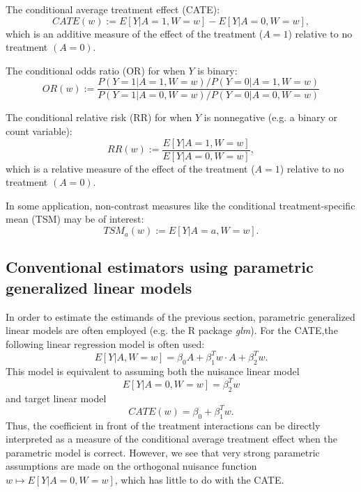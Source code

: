 \documentclass{article}
\begin{document}
\noindent The conditional average treatment effect (CATE):
\begin{equation}
CATE(w) := E[Y|A=1,W=w] - E[Y|A=0, W=w],
\end{equation}
which is an additive measure of the effect of the treatment ($A=1$) relative to no treatment $(A=0)$.

\vspace{0.5cm}


\noindent The conditional odds ratio (OR) for when $Y$ is binary:
\begin{equation}
OR(w) := \frac{P(Y=1|A=1,W=w)/P(Y=0|A=1,W=w)}{P(Y=1|A=0,W=w)/P(Y=0|A=0,W=w)}
\end{equation}

\vspace{0.5cm}

\noindent The conditional relative risk (RR) for when $Y$ is nonnegative (e.g. a binary or count variable):
\begin{equation}
RR(w) := \frac{E[Y|A=1,W=w]}{E[Y|A=0,W=w]},
\end{equation}
which is a relative measure of the effect of the treatment ($A=1$) relative to no treatment $(A=0)$.

\vspace{0.5cm}

\noindent In some application, non-contrast measures like the conditional treatment-specific mean (TSM) may be of interest:
\begin{equation}
TSM_a(w) := E[Y|A=a,W=w].
\end{equation}

\subsection{Conventional estimators using parametric generalized linear models}
In order to estimate the estimands of the previous section, parametric generalized linear models are often employed (e.g. the R package \textit{glm}). For the CATE,the following linear regression model is often used:
$$E[Y|A, W=w] = \beta_0 A +  \beta_1^T w \cdot A + \beta_2^T w.$$
This model is equivalent to assuming both the nuisance linear model
$$E[Y|A=0,W=w] =  \beta_2^T w$$
and target linear model
$$CATE(w) = \beta_0 + \beta_1^T w.$$
Thus, the coefficient in front of the treatment interactions can be directly interpreted as a measure of the conditional average treatment effect when the parametric model is correct. However, we see that very strong parametric assumptions are made on the orthogonal nuisance function $w \mapsto E[Y|A=0,W=w]$, which has little to do with the CATE.
\end{document}
